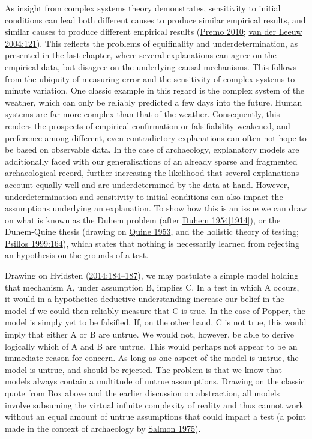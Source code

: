 \documentclass[
  a4paper,
  oneside]{uiophdthesis}
\begin{document}
As insight from complex systems theory demonstrates, sensitivity to initial conditions can lead both different causes to produce similar empirical results, and similar causes to produce different empirical results (\protect\hyperlink{ref-premo2010}{Premo 2010}; \protect\hyperlink{ref-vanderleeuw2004}{van der Leeuw 2004:121}). This reflects the problems of equifinality and underdetermination, as presented in the last chapter, where several explanations can agree on the empirical data, but disagree on the underlying causal mechanisms. This follows from the ubiquity of measuring error and the sensitivity of complex systems to minute variation. One classic example in this regard is the complex system of the weather, which can only be reliably predicted a few days into the future. Human systems are far more complex than that of the weather. Consequently, this renders the prospects of empirical confirmation or falsifiability weakened, and preference among different, even contradictory explanations can often not hope to be based on observable data. In the case of archaeology, explanatory models are additionally faced with our generalisations of an already sparse and fragmented archaeological record, further increasing the likelihood that several explanations account equally well and are underdetermined by the data at hand. However, underdetermination and sensitivity to initial conditions can also impact the assumptions underlying an explanation. To show how this is an issue we can draw on what is known as the Duhem problem (after \protect\hyperlink{ref-duhem1914}{Duhem 1954{[}1914{]}}), or the Duhem-Quine thesis (drawing on \protect\hyperlink{ref-quine1953}{Quine 1953}, and the holistic theory of testing; \protect\hyperlink{ref-psillos1999}{Psillos 1999:164}), which states that nothing is necessarily learned from rejecting an hypothesis on the grounds of a test.

Drawing on Hvidsten (\protect\hyperlink{ref-hvidsten2014}{2014:184--187}), we may postulate a simple model holding that mechanism A, under assumption B, implies C. In a test in which A occurs, it would in a hypothetico-deductive understanding increase our belief in the model if we could then reliably measure that C is true. In the case of Popper, the model is simply yet to be falsified. If, on the other hand, C is not true, this would imply that either A or B are untrue. We would not, however, be able to derive logically which of A and B are untrue. This would perhaps not appear to be an immediate reason for concern. As long as one aspect of the model is untrue, the model is untrue, and should be rejected. The problem is that we know that models always contain a multitude of untrue assumptions. Drawing on the classic quote from Box above and the earlier discussion on abstraction, all models involve subsuming the virtual infinite complexity of reality and thus cannot work without an equal amount of untrue assumptions that could impact a test (a point made in the context of archaeology by \protect\hyperlink{ref-salmon1975}{Salmon 1975}).
\end{document}
